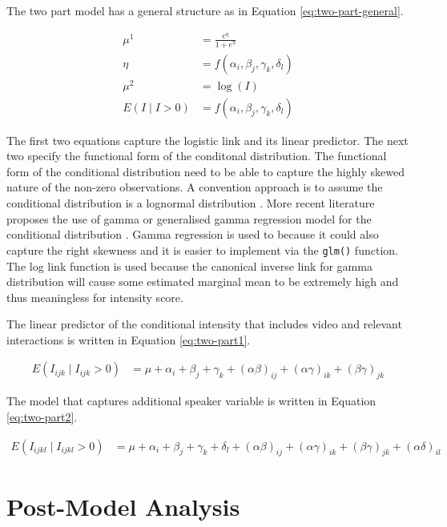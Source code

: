 \documentclass{monashthesis}
\begin{document}
The two part model has a general structure as in Equation \ref{eq:two-part-general}.

\begin{align}\label{eq:two-part-general}
\mu^1 &= \frac{e^{\eta}}{1 + e^{\eta}} \\
\eta &= f(\alpha_i, \beta_j, \gamma_k, \delta_l) \\
\mu^2 &= \log(I) \\
E(I \mid I > 0) &= f(\alpha_i, \beta_j, \gamma_k, \delta_l)
\end{align}

\noindent The first two equations capture the logistic link and its linear predictor. The next two specify the functional form of the conditonal distribution. The functional form of the conditional distribution need to be able to capture the highly skewed nature of the non-zero observations. A convention approach is to assume the conditional distribution is a lognormal distribution \autocites{manning1981two}{diehr1999methods}. More recent literature proposes the use of gamma or generalised gamma regression model for the conditional distribution \autocite{twopart2010}. Gamma regression is used to because it could also capture the right skewness and it is easier to implement via the \texttt{glm()} function. The log link function is used because the canonical inverse link for gamma distribution will cause some estimated marginal mean to be extremely high and thus meaningless for intensity score.

The linear predictor of the conditional intensity that includes video and relevant interactions is written in Equation \ref{eq:two-part1}.

\begin{align}\label{eq:two-part1}
E(I_{ijk} \mid I_{ijk} > 0) &= \mu + \alpha_i + \beta_j +\gamma_k + (\alpha\beta)_{ij} + (\alpha\gamma)_{ik} + (\beta\gamma)_{jk}
\end{align}

The model that captures additional speaker variable is written in Equation \ref{eq:two-part2}.

\begin{align}\label{eq:two-part2}
E(I_{ijkl} \mid I_{ijkl} > 0) &= \mu + \alpha_i + \beta_j +\gamma_k + \delta_l + (\alpha\beta)_{ij} + (\alpha\gamma)_{ik} + (\beta\gamma)_{jk} + (\alpha\delta)_{il}
\end{align}

\newpage

\hypertarget{post-model-analysis}{%
\section{Post-Model Analysis}\label{post-model-analysis}}
\end{document}
